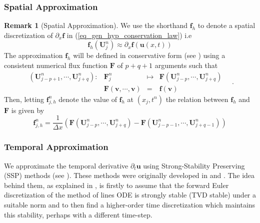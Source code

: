 \documentclass[12pt,a4paper]{article}
\numberwithin{equation}{section}
\theoremstyle{definition}
\newcommand{\dfunkmapstonumflux}[5]{\ensuremath{
		\begin{array}{rccl}
			{#1}: & {#2} &\mapsto&{#3}
			\\
			& {#4} &=&{#5}
		\end{array}\quad}}
\newcommand{\vect}[1]{\textbf{#1}}
\newcommand{\qp}[1]{\left(#1\right)}
\newtheorem{Rem}[subsection]{Remark}
\begin{document}
\subsubsection{Spatial Approximation}
\begin{Rem}[Spatial Approximation]
We use the shorthand $\vect{f}_h$ to denote a spatial discretization of $\partial_x\vect{f}$ in (\ref{eq_gen_hyp_conservation_law}) i.e
\begin{equation}
\vect{f}_h\qp{\vect{U}^n_j}\approx\partial_x\vect{f}\qp{\vect{u}\qp{x,t}}
\end{equation}
The approximation $\vect{f}_h$ will be defined in  conservative form (see \cite[\S12]{leveque1992numerical}) using a consistent numerical flux function $\vect{F}$ of $p+q+1$ arguments such that
\begin{equation}\label{eq_defn_num_flux}
\dfunkmapstonumflux{\qp{\vect{U}^n_{j-p+1},\cdots,\vect{U}^n_{j+q}}}{\vect{F}^n_j}{\vect{F}\qp{\vect{U}^n_{j-p},\cdots,\vect{U}^n_{j+q}}}{\vect{F}\qp{\vect{v},\cdots,\vect{v}}}{\vect{f}\qp{\vect{v}}}.
\end{equation}
Then, letting $\vect{f}^n_{j,h}$ denote the value of $\vect{f}_h$ at $\qp{x_j, t^n}$ the relation between $\vect{f}_h$ and $\vect{F}$ is given by 
\begin{equation}
\vect{f}^n_{j,h}=\frac{1}{\Delta x}\qp{{\vect{F}\qp{\vect{U}^n_{j-p},\cdots,\vect{U}^n_{j+q}}}-{\vect{F}\qp{\vect{U}^n_{j-p-1},\cdots,\vect{U}^n_{j+q-1}}}}
\end{equation}
\end{Rem}
\subsubsection{Temporal Approximation}
We approximate the temporal derivative $\partial_t\vect{u}$ using Strong-Stability Preserving (SSP) methods (see \cite{gottlieb2001strong}).  These methods were originally developed in \cite{shu1988total} and \cite{shu1988efficient}.  The idea behind them, as explained in \cite{gottlieb2001strong}, is firstly to assume that the forward Euler discretization of the method of lines ODE is strongly stable (TVD stable) under a suitable norm and to then find a higher-order time discretization which maintains this stability, perhaps with a different time-step.
\end{document}
